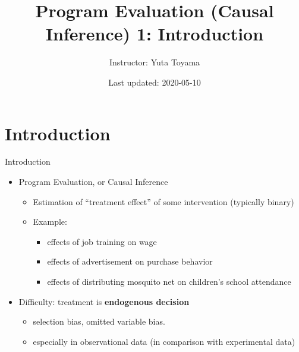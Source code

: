 \documentclass[
  ignorenonframetext,
]{beamer}
\title{Program Evaluation (Causal Inference) 1: Introduction}
\author{Instructor: Yuta Toyama}
\date{Last updated: 2020-05-10}
\providecommand{\tightlist}{%
  \setlength{\itemsep}{0pt}\setlength{\parskip}{0pt}}
\begin{document}
\frame{\titlepage}

\hypertarget{introduction}{%
\section{Introduction}\label{introduction}}

\begin{frame}{Introduction}
\protect\hypertarget{introduction-1}{}
\begin{itemize}
\item
  Program Evaluation, or Causal Inference

  \begin{itemize}
  \item
    Estimation of ``treatment effect'' of some intervention (typically
    binary)
  \item
    Example:

    \begin{itemize}
    \tightlist
    \item
      effects of job training on wage
    \item
      effects of advertisement on purchase behavior
    \item
      effects of distributing mosquito net on children's school
      attendance
    \end{itemize}
  \end{itemize}
\item
  Difficulty: treatment is \textbf{endogenous decision}

  \begin{itemize}
  \item
    selection bias, omitted variable bias.
  \item
    especially in observational data (in comparison with experimental
    data)
  \end{itemize}
\end{itemize}
\end{frame}
\end{document}
